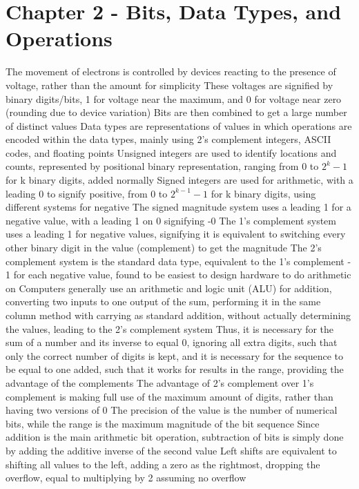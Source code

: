 \documentclass[11 pt, twoside]{article}
\newenvironment{outline*}
{
	\begin{outline}[enumerate]
	}
	{\end{outline}
}
\begin{document}
\section{Chapter 2 - Bits, Data Types, and Operations}
\begin{outline*}
\1 The movement of electrons is controlled by devices reacting to the presence of voltage, rather than the amount for simplicity
\2 These voltages are signified by binary digits/bits, 1 for voltage near the maximum, and 0 for voltage near zero (rounding due to device variation)
\2 Bits are then combined to get a large number of distinct values
\1 Data types are representations of values in which operations are encoded within the data types, mainly using 2's complement integers, ASCII codes, and floating points
\2 Unsigned integers are used to identify locations and counts, represented by positional binary representation, ranging from 0 to $2^k - 1$ for k binary digits, added normally
\2 Signed integers are used for arithmetic, with a leading 0 to signify positive, from 0 to $2^{k-1} - 1$ for k binary digits, using different systems for negative
\3 The signed magnitude system uses a leading 1 for a negative value, with a leading 1 on 0 signifying -0
\3 The 1's complement system uses a leading 1 for negative values, signifying it is equivalent to switching every other binary digit in the value (complement) to get the magnitude
\3 The 2's complement system is the standard data type, equivalent to the 1's complement - 1 for each negative value, found to be easiest to design hardware to do arithmetic on
\1 Computers generally use an arithmetic and logic unit (ALU) for addition, converting two inputs to one output of the sum, performing it in the same column method with carrying as standard addition, without actually determining the values, leading to the 2's complement system
\2 Thus, it is necessary for the sum of a number and its inverse to equal 0, ignoring all extra digits, such that only the correct number of digits is kept, and it is necessary for the sequence to be equal to one added, such that it works for results in the range, providing the advantage of the complements
\2 The advantage of 2's complement over 1's complement is making full use of the maximum amount of digits, rather than having two versions of 0
\2 The precision of the value is the number of numerical bits, while the range is the maximum magnitude of the bit sequence
\1 Since addition is the main arithmetic bit operation, subtraction of bits is simply done by adding the additive inverse of the second value
\2 Left shifts are equivalent to shifting all values to the left, adding a zero as the rightmost, dropping the overflow, equal to multiplying by 2 assuming no overflow

\end{outline*}
\end{document}
